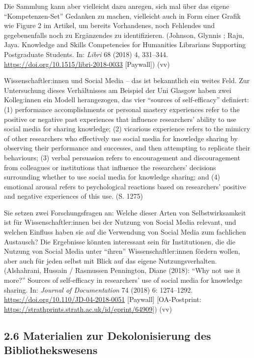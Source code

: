 \documentclass[a4paper,
fontsize=11pt,
oneside,
numbers=noperiodatend,
parskip=half-,
bibliography=totoc,
final
]{scrartcl}
\begin{document}
Die Sammlung kann aber vielleicht dazu anregen, sich mal über das eigene
\enquote{Kompetenzen-Set} Gedanken zu machen, vielleicht auch in Form
einer Grafik wie Figure 2 im Artikel, um bereits Vorhandenes, noch
Fehlendes und gegebenenfalls noch zu Ergänzendes zu identifizieren.
(Johnson, Glynnis ; Raju, Jaya. Knowledge and Skills Competencies for
Humanities Librarians Supporting Postgraduate Students. In: \emph{Libri}
68 (2018) 4, 331--344. \url{https://doi.org/10.1515/libri-2018-0033}
{[}Paywall{]}) (vv)

Wissenschaftler:innen und Social Media -- das ist bekanntlich ein weites
Feld. Zur Untersuchung dieses Verhältnisses am Beispiel der Uni Glasgow
haben zwei Kolleg:innen ein Modell herangezogen, das vier
\enquote{sources of self-efficacy} definiert: (1) performance
accomplishments or personal mastery experiences refer to the positive or
negative past experiences that influence researchers' ability to use
social media for sharing knowledge; (2) vicarious experience refers to
the mimicry of other researchers who effectively use social media for
knowledge sharing by observing their performance and successes, and then
attempting to replicate their behaviours; (3) verbal persuasion refers
to encouragement and discouragement from colleagues or institutions that
influence the researchers' decisions surrounding whether to use social
media for knowledge sharing; and (4) emotional arousal refers to
psychological reactions based on researchers' positive and negative
experiences of this use. (S. 1275)

Sie setzen zwei Forschungsfragen an: Welche dieser Arten von
Selbstwirksamkeit ist für Wissenschaftler:innen bei der Nutzung von
Social Media relevant, und welchen Einfluss haben sie auf die Verwendung
von Social Media zum fachlichen Austausch? Die Ergebnisse könnten
interessant sein für Institutionen, die die Nutzung von Social Media
unter \enquote{ihren} Wissenschaftler:innen fördern wollen, aber auch
für jeden selbst mit Blick auf das eigene Nutzungsverhalten.
(Alshahrani, Hussain / Rasmussen Pennington, Diane (2018): \enquote{Why
not use it more?} Sources of self-efficacy in researchers' use of social
media for knowledge sharing. In: \emph{Journal of Documentation} 74
(2018) 6: 1274--1292. \url{https://doi.org/10.110/JD-04-2018-0051}
{[}Paywall{]} {[}OA-Postprint:
\url{https://strathprints.strath.ac.uk/id/eprint/64909}{]}) (vv)

\hypertarget{materialien-zur-dekolonisierung-des-bibliothekswesens}{%
\subsection{2.6 Materialien zur Dekolonisierung des
Bibliothekswesens}\label{materialien-zur-dekolonisierung-des-bibliothekswesens}}
\end{document}
